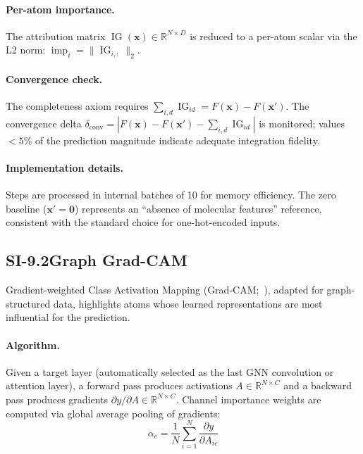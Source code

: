 \documentclass[11pt]{article}
\begin{document}
\paragraph{Per-atom importance.}
The attribution matrix
$\operatorname{IG}(\mathbf{x}) \in \mathbb{R}^{N \times D}$ is reduced
to a per-atom scalar via the L2 norm:
$\operatorname{imp}_i = \|\operatorname{IG}_{i,:}\|_2$.

\paragraph{Convergence check.}
The completeness axiom requires
$\sum_{i,d} \operatorname{IG}_{id} = F(\mathbf{x}) - F(\mathbf{x}')$.
The convergence delta
$\delta_{\mathrm{conv}} = |F(\mathbf{x}) - F(\mathbf{x}')
- \sum_{i,d} \operatorname{IG}_{id}|$
is monitored; values $< 5\%$ of the prediction magnitude indicate
adequate integration fidelity.

\paragraph{Implementation details.}
Steps are processed in internal batches of 10 for memory efficiency.
The zero baseline ($\mathbf{x}' = \mathbf{0}$) represents an
``absence of molecular features'' reference, consistent with the
standard choice for one-hot-encoded inputs.

\subsection*{SI-9.2\quad Graph Grad-CAM}

Gradient-weighted Class Activation Mapping
(Grad-CAM;~\cite{selvaraju2017grad}), adapted for graph-structured data,
highlights atoms whose learned representations are most influential for
the prediction.

\paragraph{Algorithm.}
Given a target layer (automatically selected as the last GNN convolution
or attention layer), a forward pass produces activations
$A \in \mathbb{R}^{N \times C}$ and a backward pass produces
gradients $\partial y / \partial A \in \mathbb{R}^{N \times C}$.
Channel importance weights are computed via global average pooling of gradients:
\begin{equation}
  \alpha_c = \frac{1}{N} \sum_{i=1}^{N}
  \frac{\partial y}{\partial A_{ic}}
  \label{eq:gradcam_weights}
\end{equation}
\end{document}
